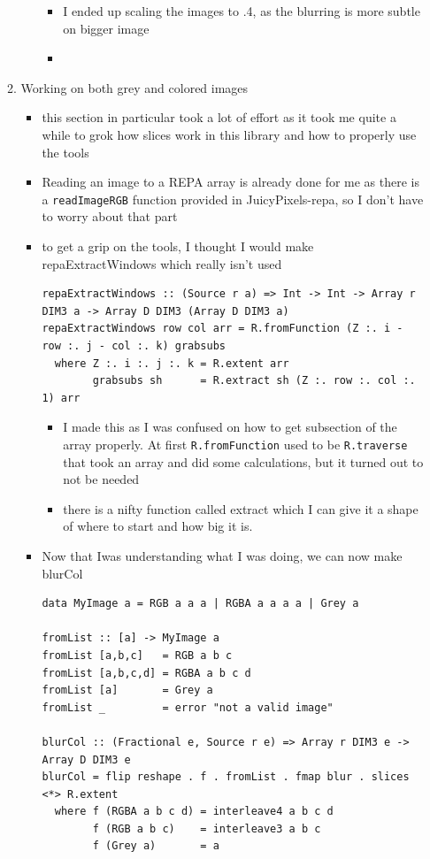 \documentclass{article}
\begin{document}
\begin{enumerate}
\begin{enumerate}
\begin{itemize}
\begin{itemize}
\item I ended up scaling the images to .4, as the blurring is more
subtle on bigger image
\item 
\end{itemize}
\end{itemize}
\item Working on both grey and colored images
\label{sec-2-2-3}
\begin{itemize}
\item this section in particular took a lot of effort as it took me quite
a while to grok how slices work in this library and how to properly
use the tools
\item Reading an image to a REPA array is already done for me as there is
a \texttt{readImageRGB} function provided in JuicyPixels-repa, so I don't
have to worry about that part
\item to get a grip on the tools, I thought Ι would make
repaExtractWindows which really isn't used
\begin{verbatim}
repaExtractWindows :: (Source r a) => Int -> Int -> Array r DIM3 a -> Array D DIM3 (Array D DIM3 a)
repaExtractWindows row col arr = R.fromFunction (Z :. i - row :. j - col :. k) grabsubs
  where Z :. i :. j :. k = R.extent arr
        grabsubs sh      = R.extract sh (Z :. row :. col :. 1) arr
\end{verbatim}
\begin{itemize}
\item I made this as I was confused on how to get subsection of the
array properly. At first \texttt{R.fromFunction} used to be \texttt{R.traverse}
that took an array and did some calculations, but it turned out to not
be needed
\item there is a nifty function called extract which I can give it a
shape of where to start and how big it is.
\end{itemize}
\item Now that Ιwas understanding what I was doing, we can now make
blurCol
\begin{verbatim}
data MyImage a = RGB a a a | RGBA a a a a | Grey a

fromList :: [a] -> MyImage a
fromList [a,b,c]   = RGB a b c
fromList [a,b,c,d] = RGBA a b c d
fromList [a]       = Grey a
fromList _         = error "not a valid image"

blurCol :: (Fractional e, Source r e) => Array r DIM3 e -> Array D DIM3 e
blurCol = flip reshape . f . fromList . fmap blur . slices <*> R.extent
  where f (RGBA a b c d) = interleave4 a b c d
        f (RGB a b c)    = interleave3 a b c
        f (Grey a)       = a


\end{verbatim}
\end{itemize}
\end{enumerate}
\end{enumerate}
\end{document}
